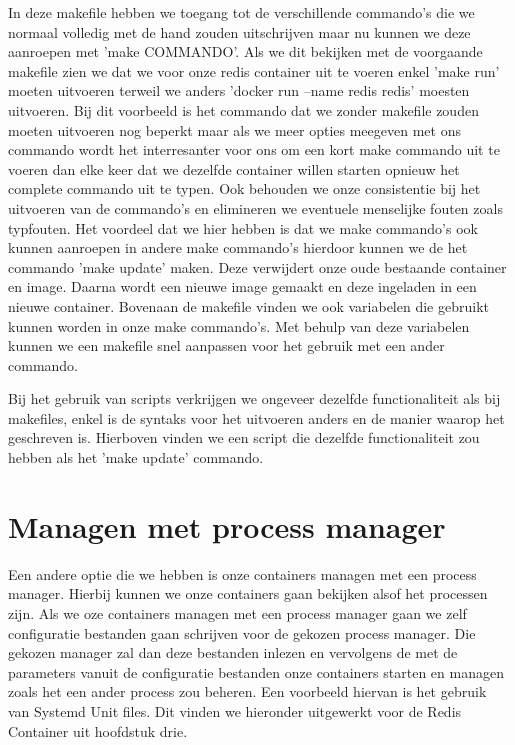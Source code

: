 In deze makefile hebben we toegang tot de verschillende commando's die we normaal volledig met de hand zouden uitschrijven maar nu kunnen we deze aanroepen met 'make COMMANDO'. Als we dit bekijken met de voorgaande makefile zien we dat we voor onze redis container uit te voeren enkel 'make run' moeten uitvoeren terweil we anders 'docker run --name redis redis' moesten uitvoeren. Bij dit voorbeeld is het commando dat we zonder makefile zouden moeten uitvoeren nog beperkt maar als we meer opties meegeven met ons commando wordt het interresanter voor ons om een kort make commando uit te voeren dan elke keer dat we dezelfde container willen starten opnieuw het complete commando uit te typen. Ook behouden we onze consistentie bij het uitvoeren van de commando's en elimineren we eventuele menselijke fouten zoals typfouten. Het voordeel dat we hier hebben is dat we make commando's ook kunnen aanroepen in andere make commando's hierdoor kunnen we de het commando 'make update' maken. Deze verwijdert onze oude bestaande container en image. Daarna wordt een nieuwe image gemaakt en deze ingeladen in een nieuwe container. Bovenaan de makefile vinden we ook variabelen die gebruikt kunnen worden in onze make commando's. Met behulp van deze variabelen kunnen we een makefile snel aanpassen voor het gebruik met een ander commando.


Bij het gebruik van scripts verkrijgen we ongeveer dezelfde functionaliteit als bij makefiles, enkel is de syntaks voor het uitvoeren anders en de manier waarop het geschreven is. Hierboven vinden we een script die dezelfde functionaliteit zou hebben als het 'make update' commando.



\section{Managen met process manager}

Een andere optie die we hebben is onze containers managen met een process manager. Hierbij kunnen we onze containers gaan bekijken alsof het processen zijn. Als we oze containers managen met een process manager gaan we zelf configuratie bestanden gaan schrijven voor de gekozen process manager. Die gekozen manager zal dan deze bestanden inlezen en vervolgens de met de parameters vanuit de configuratie bestanden onze containers starten en managen zoals het een ander process zou beheren. Een voorbeeld hiervan is het gebruik van Systemd Unit files. Dit vinden we hieronder uitgewerkt voor de Redis Container uit hoofdstuk drie.

